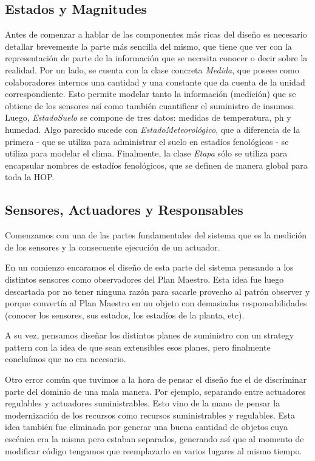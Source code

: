 \subsection{Estados y Magnitudes}

Antes de comenzar a hablar de las componentes más ricas del diseño es necesario detallar brevemente la parte más sencilla del mismo, que tiene que ver con la representación de parte de la información que se necesita conocer o decir sobre la realidad. Por un lado, se cuenta con la clase concreta \textsl{Medida}, que poseee como colaboradores internos una cantidad y una constante que da cuenta de la unidad correspondiente. Esto permite modelar tanto la información (medición) que se obtiene de los sensores así como también cuantificar el suministro de insumos. Luego, \textsl{EstadoSuelo} se compone de tres datos: medidas de temperatura, ph y humedad. Algo parecido sucede con \textsl{EstadoMeteorológico}, que a diferencia de la primera - que se utiliza para administrar el suelo en estadíos fenológicos - se utiliza para modelar el clima. Finalmente, la clase \textsl{Etapa} sólo se utiliza para encapsular nombres de estadíos fenológicos, que se definen de manera global para toda la HOP.

\subsection{Sensores, Actuadores y Responsables}
Comenzamos con una de las partes fundamentales del sistema que es la medición de los sensores y la consecuente ejecución de un actuador. \newline

 
En un comienzo encaramos el diseño de esta parte del sistema pensando a los distintos sensores como observadores del Plan Maestro. Esta idea fue luego descartada por no tener ninguna razón para sacarle provecho al patrón observer y porque convertía al Plan Maestro en un objeto con demasiadas responsabilidades (conocer los sensores, sus estados, los estadíos de la planta, etc).

A su vez, pensamos diseñar los distintos planes de suministro con un strategy pattern con la idea de que sean extensibles esos planes, pero finalmente concluímos que no era necesario.\newline


 
Otro error común que tuvimos a la hora de pensar el diseño fue el de discriminar parte del dominio de una mala manera. Por ejemplo, separando entre actuadores regulables y actuadores suministrables. Esto vino de la mano de pensar la modernización de los recursos como recursos suministrables y regulables. Esta idea también fue eliminada por generar una buena cantidad de objetos cuya escénica era la misma pero estaban separados, generando así que al momento de modificar código tengamos que reemplazarlo en varios lugares al mismo tiempo.\newline

